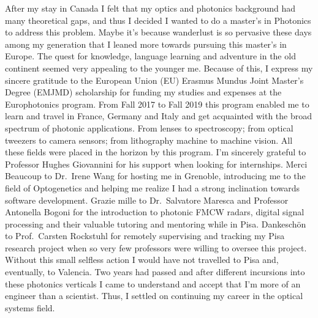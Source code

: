 After my stay in Canada I felt that my optics and photonics background had many theoretical gaps, and thus I decided I wanted to do a master's in Photonics to address this problem.
Maybe it's because wanderlust is so pervasive these days among my generation that I leaned more towards pursuing this master's in Europe.
The quest for knowledge, language learning and adventure in the old continent seemed very appealing to the younger me.
Because of this, I express my sincere gratitude to the European Union (EU) Erasmus Mundus Joint Master's Degree (EMJMD) scholarship for funding my studies and expenses at the Europhotonics program.
From Fall 2017 to Fall 2019 this program enabled me to learn and travel in France, Germany and Italy and get acquainted with the broad spectrum of photonic applications.
From lenses to spectroscopy; from optical tweezers to camera sensors; from lithography machine to machine vision.
All these fields were placed in the horizon by this program.
I'm sincerely grateful to Professor Hughes Giovannini for his support when looking for internships.
Merci Beaucoup to Dr.~Irene Wang for hosting me in Grenoble, introducing me to the field of Optogenetics and helping me realize I had a strong inclination towards software development.
Grazie mille to Dr.~Salvatore Maresca and Professor Antonella Bogoni for the introduction to photonic FMCW radars, digital signal processing and their valuable tutoring and mentoring while in Pisa.
Dankeschön to Prof.~Carsten Rockstuhl for remotely supervising and tracking my Pisa research project when so very few professors were willing to oversee this project.
Without this small selfless action I would have not travelled to Pisa and, eventually, to Valencia.
Two years had passed and after different incursions into these photonics verticals I came to understand and accept that I'm more of an engineer than a scientist.
Thus, I settled on continuing my career in the optical systems field.

